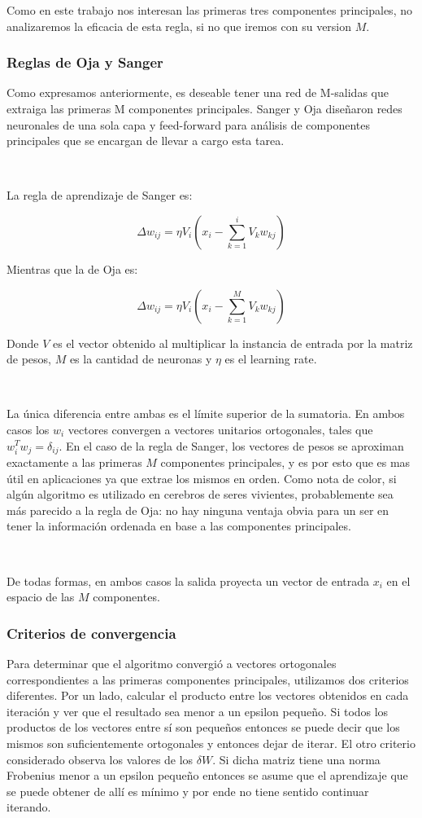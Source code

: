 \documentclass[informe.tex]{subfiles}
\begin{document}
	Como en este trabajo nos interesan las primeras tres componentes principales, no analizaremos la eficacia de esta regla, si no que iremos con su version $M$.
      
      \subsubsection{Reglas de Oja y Sanger}
	Como expresamos anteriormente, es deseable tener una red de M-salidas que extraiga las primeras M componentes principales. Sanger y Oja diseñaron redes neuronales de una sola capa y feed-forward para análisis de componentes principales que se encargan de llevar a cargo esta tarea.
	
	~
	
	La regla de aprendizaje de Sanger es:

	$$\Delta w_{ij} = \eta V_i(x_i - \sum_{k=1}^{i} V_k w_{kj} )$$

	Mientras que la de Oja es:

	$$\Delta w_{ij} = \eta V_i(x_i - \sum_{k=1}^{M} V_k w_{kj} )$$
	
	Donde $V$ es el vector obtenido al multiplicar la instancia de entrada por la matriz de pesos, $M$ es la cantidad de neuronas y $\eta$ es el learning rate.
	
	~

	La única diferencia entre ambas es el límite superior de la sumatoria. En ambos casos los $w_i$ vectores convergen a vectores unitarios ortogonales, tales que $w^{T}_i w_j = \delta_{ij}$. En el caso de la regla de Sanger, los vectores de pesos se aproximan exactamente a las primeras $M$ componentes principales, y es por esto que es mas \'util en aplicaciones ya que extrae los mismos en orden. Como nota de color, si algún algoritmo es utilizado en cerebros de seres vivientes, probablemente sea más parecido a la regla de Oja: no hay ninguna ventaja obvia para un ser en tener la información ordenada en base a las componentes principales. 
	
	~

	De todas formas, en ambos casos la salida proyecta un vector de entrada $x_i$ en el espacio de las $M$ componentes.
	
      \subsubsection{Criterios de convergencia}
	Para determinar que el algoritmo convergió a vectores ortogonales correspondientes a las primeras componentes principales, utilizamos dos criterios diferentes. Por un lado, calcular el producto entre los vectores obtenidos en cada iteración y ver que el resultado sea menor a un epsilon pequeño. Si todos los productos de los vectores entre sí son pequeños entonces se puede decir que los mismos son suficientemente ortogonales y entonces dejar de iterar. El otro criterio considerado observa los valores de los $\delta W$. Si dicha matriz tiene una norma Frobenius menor a un epsilon pequeño entonces se asume que el aprendizaje que se puede obtener de allí es mínimo y por ende no tiene sentido continuar iterando.
	
\end{document}
